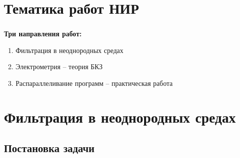 

\frame[plain]{\titlepage} %


\section{Тематика работ НИР}

\begin{frame}
\frametitle{\insertsection}

\textbf{Три направления работ:}
\begin{enumerate}
    \item Фильтрация в неоднородных средах
    \item Электрометрия -- теория БКЗ
    \item Распараллеливание программ -- практическая работа
\end{enumerate}
\end{frame}


\section{Фильтрация в неоднородных средах}


\subsection{Постановка задачи}

